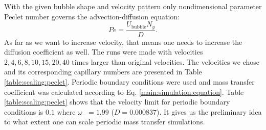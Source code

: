 \documentclass{article}
\newcommand{\beq}{\begin{equation}}
\newcommand{\feq}{\end{equation}}
\newcommand{\ububble}{U_{\mathrm{bubble}}}
\newcommand{\omegaminus}{\omega_{-}}
\begin{document}
With the given bubble shape and velocity pattern only nondimensional parameter Peclet number governs
the advection-diffusion equation:
\beq
Pe=\frac{\ububble N_y}{D}.
\feq
As far as we want to increase velocity, that
means one needs to increase the diffusion coefficient as well. The runs were made with
velocities $2,4,6,8,10,15,20,40$ times larger than original velocities. The velocities we chose and
its corresponding capillary numbers are presented in Table \ref{table:scaling:peclet}. Periodic
boundary conditions were used and mass transfer coefficient was calculated according to Eq.
\ref{main:simulation:equation}. Table \ref{table:scaling:peclet} shows that the velocity limit
for  periodic boundary conditions is $0.1$ where $\omegaminus=1.99$ ($D=0.000837$). It gives us the
preliminary idea to what extent one can scale periodic mass transfer simulations. 
\end{document}
